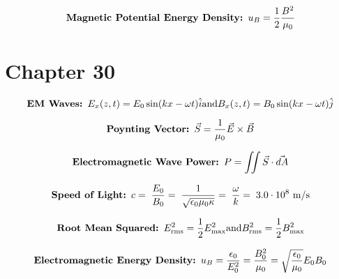 \documentclass[fleqn,12pt]{article}
\begin{document}
\begin{equation}
    \label{eq3}
    \mbox{\textbf{Magnetic Potential Energy Density: }}u_B = \frac{1}{2}\frac{B^2}{\mu_0}
\end{equation}

\section*{Chapter 30}

\begin{equation}
    \label{eq3}
    \mbox{\textbf{EM Waves: }}
    {E_x}(z,t) = {E_0}\sin(kx - \omega t)\hat{i} \\ \mbox{and} \\ {B_x}(z,t) = {B_0}\sin(kx - \omega t)\hat{j}
\end{equation}


\begin{equation}
    \label{eq3}
    \mbox{\textbf{Poynting Vector: }}
    \vec{S} = \frac{1}{\mu_0}\vec{E} \times \vec{B} 
\end{equation}

\begin{equation}
    \label{eq3}
    \mbox{\textbf{Electromagnetic Wave Power: }}
    P = \iint \vec{S} \cdot \vec{dA}
\end{equation}

\begin{equation}
    \label{eq3}
    \mbox{\textbf{Speed of Light: }}
    c = \; \frac{E_0}{B_0} = \; \frac{1}{\sqrt{\epsilon_0\mu_0\kappa}} = \; \frac{\omega}{k}  = \; 3.0 \cdot 10^8 \  \si{\meter\per\second}
\end{equation}

\begin{equation}
    \label{eq3}
    \mbox{\textbf{Root Mean Squared: }}
    E_\mathrm{rms}^{2} = \frac{1}{2}E_\mathrm{max}^2 \\ \mbox{and} \\ B_\mathrm{rms}^{2} = \frac{1}{2}B_\mathrm{max}^2
\end{equation}

\begin{equation}
    \label{eq3}
    \mbox{\textbf{Electromagnetic Energy Density: }}
    u_B = \frac{\epsilon_0}{E_{0}^2} = \frac{B_0^2}{\mu_0} = \sqrt{\frac{\epsilon_0}{\mu_0}}E_0 B_0
\end{equation}
\end{document}
